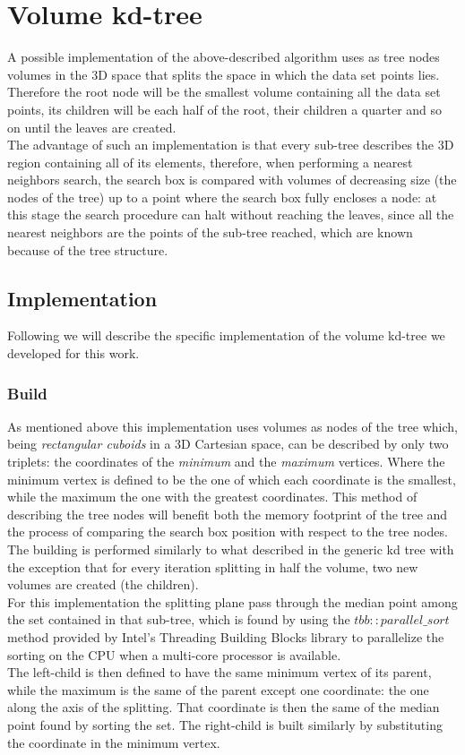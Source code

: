 \section{Volume kd-tree}
A possible implementation of the above-described algorithm uses as tree nodes volumes in the 3D space that splits the space in which the data set points lies. Therefore the root node will be the smallest volume containing all the data set points, its children will be each half of the root, their children a quarter and so on until the leaves are created.\\
The advantage of such an implementation is that every sub-tree describes the 3D region containing all of its elements, therefore, when performing a nearest neighbors search, the search box is compared with volumes of decreasing size (the nodes of the tree) up to a point where the search box fully encloses a node: at this stage the search procedure can halt without reaching the leaves, since all the nearest neighbors are the points of the sub-tree reached, which are known because of the tree structure.\\

\subsection{Implementation}
Following we will describe the specific implementation of the volume kd-tree we developed for this work.
\subsubsection{Build}
As mentioned above this implementation uses volumes as nodes of the tree which, being \textit{rectangular cuboids} in a 3D Cartesian space, can be described by only two triplets: the coordinates of the \textit{minimum} and the \textit{maximum} vertices. Where the minimum vertex is defined to be the one of which each coordinate is the smallest, while the maximum the one with the greatest coordinates. This method of describing the tree nodes will benefit both the memory footprint of the tree and the process of comparing the search box position with respect to the tree nodes.\\
The building is performed similarly to what described in the generic kd tree with the exception that for every iteration splitting in half the volume, two new volumes are created (the children).\\
For this implementation the splitting plane pass through the median point among the set contained in that sub-tree, which is found by using the \textit{$tbb::parallel\_sort$} method provided by Intel's Threading Building Blocks library to parallelize the sorting on the CPU when a multi-core processor is available.\\
The left-child is then defined to have the same minimum vertex of its parent, while the maximum is the same of the parent except one coordinate: the one along the axis of the splitting. That coordinate is then the same of the median point found by sorting the set. The right-child is built similarly by substituting the coordinate in the minimum vertex.\\

